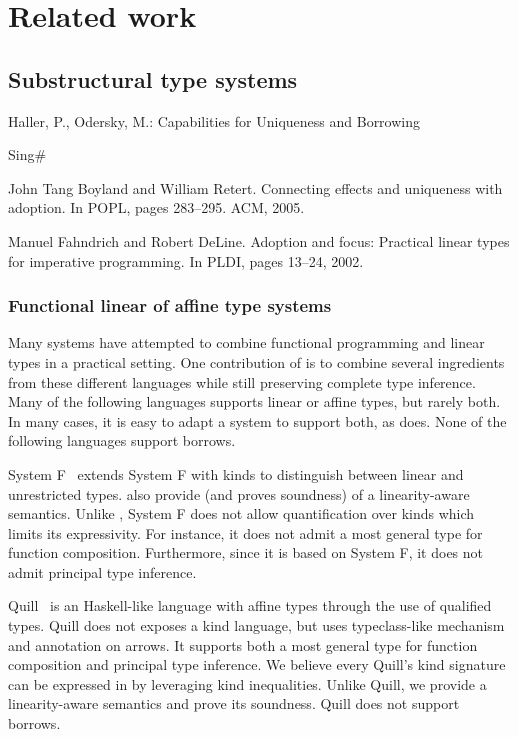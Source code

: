 \section{Related work}

\subsection{Substructural type systems}

Haller, P., Odersky, M.: Capabilities for Uniqueness and Borrowing
\cite{DBLP:conf/ecoop/HallerO10}

Sing\#

John Tang Boyland and William Retert. Connecting effects and
uniqueness with adoption. In POPL, pages 283–295. ACM, 2005.
\cite{DBLP:conf/popl/BoylandR05}

Manuel Fahndrich and Robert DeLine. Adoption and focus: Practical
linear types for imperative programming. In PLDI, pages 13–24, 2002.

\subsubsection{Functional linear of affine type systems}

Many systems have attempted to combine
functional programming and linear types in a practical setting.
One contribution of \lang is to combine several ingredients
from these different languages while still preserving
complete type inference.
Many of the following languages supports linear or affine types, but rarely
both. In many cases, it is easy to adapt a system to support both, as
\lang does.
None of the following languages support borrows.

System F\degree~\citep{DBLP:conf/tldi/MazurakZZ10}
extends System F with kinds to distinguish
between linear and unrestricted types.
\citet{DBLP:conf/tldi/MazurakZZ10} also provide
(and proves soundness) of a linearity-aware semantics.
Unlike \lang, System F\degree{} does not allow
quantification over kinds which limits its expressivity. For instance, it
does not admit a most general type for function composition.
Furthermore, since it is based on System F, it does not admit
principal type inference.

Quill~\citep{DBLP:conf/icfp/Morris16} is an Haskell-like language with affine
types through the use of qualified types.
Quill does not exposes a kind language, but
uses typeclass-like mechanism and annotation on arrows.
It supports both a most general type for function composition and
principal type inference.
We believe every Quill's kind signature can be expressed in \lang by leveraging
kind inequalities.
Unlike Quill,
we provide a linearity-aware semantics and prove its soundness.
Quill does not support borrows.

